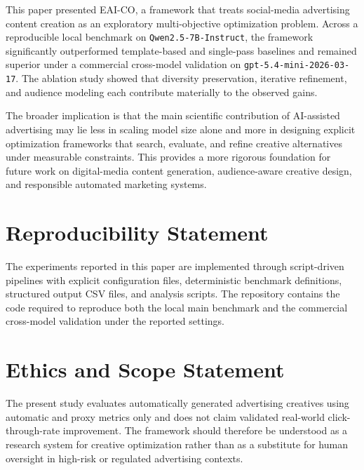 \documentclass[preprint,12pt]{elsarticle}
\begin{document}
This paper presented EAI-CO, a framework that treats social-media advertising content creation as an exploratory multi-objective optimization problem. Across a reproducible local benchmark on \texttt{Qwen2.5-7B-Instruct}, the framework significantly outperformed template-based and single-pass baselines and remained superior under a commercial cross-model validation on \texttt{gpt-5.4-mini-2026-03-17}. The ablation study showed that diversity preservation, iterative refinement, and audience modeling each contribute materially to the observed gains.

The broader implication is that the main scientific contribution of AI-assisted advertising may lie less in scaling model size alone and more in designing explicit optimization frameworks that search, evaluate, and refine creative alternatives under measurable constraints. This provides a more rigorous foundation for future work on digital-media content generation, audience-aware creative design, and responsible automated marketing systems.

\section*{Reproducibility Statement}

The experiments reported in this paper are implemented through script-driven pipelines with explicit configuration files, deterministic benchmark definitions, structured output CSV files, and analysis scripts. The repository contains the code required to reproduce both the local main benchmark and the commercial cross-model validation under the reported settings.

\section*{Ethics and Scope Statement}

The present study evaluates automatically generated advertising creatives using automatic and proxy metrics only and does not claim validated real-world click-through-rate improvement. The framework should therefore be understood as a research system for creative optimization rather than as a substitute for human oversight in high-risk or regulated advertising contexts.
\end{document}
